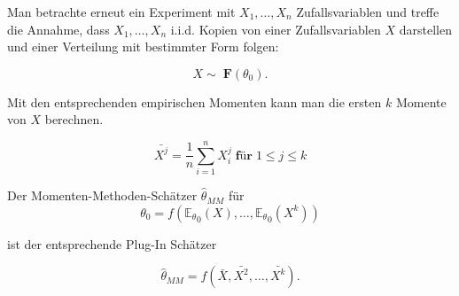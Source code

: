 \documentclass[10pt]{article}
\newcommand{\FZV}{X_1, \ldots, X_n} %
\newcommand{\EW}{\mathbb{E}} %
\begin{document}
	\noindent Man betrachte erneut ein Experiment mit $\FZV$ Zufallsvariablen und treffe die Annahme, dass $\FZV$ i.i.d. Kopien von einer Zufallsvariablen $X$ darstellen und einer Verteilung mit bestimmter Form folgen:

\vspace{-2mm}
\begin{equation*}
	X \sim \; \textbf{F}(\theta_0).
\end{equation*}

	\noindent Mit den entsprechenden empirischen Momenten kann man die ersten $k$ Momente von $X$ berechnen. 

\begin{equation*}
	\bar{X^j} = \frac{1}{n} \sum_{i=1}^n X_i^j\; \textbf{für} \; 1\leq j \leq k 
\end{equation*}

	\noindent Der Momenten-Methoden-Schätzer $\hat{\theta}_{MM}$ für 
\begin{equation*}
\theta_0 = f({\EW_\theta}_{0}(X),\ldots,{\EW_\theta}_{0}(X^k))
\end{equation*}

	\noindent ist der entsprechende Plug-In Schätzer

\begin{equation*}
	\hat{\theta}_{MM} = f(\bar{X},\bar{X^2}, \ldots, \bar{X^k}).
\end{equation*}
\end{document}
